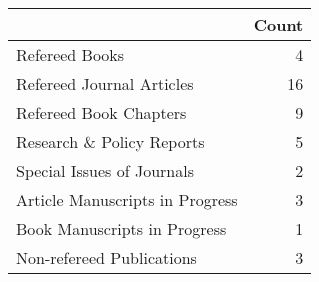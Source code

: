 \begin{tabular}{lr}
\toprule
 & Count \\
\midrule
Refereed Books & 4 \\
Refereed Journal Articles & 16 \\
Refereed Book Chapters & 9 \\
Research \& Policy Reports & 5 \\
Special Issues of Journals & 2 \\
Article Manuscripts in Progress & 3 \\
Book Manuscripts in Progress & 1 \\
Non-refereed Publications & 3 \\
\bottomrule
\end{tabular}
